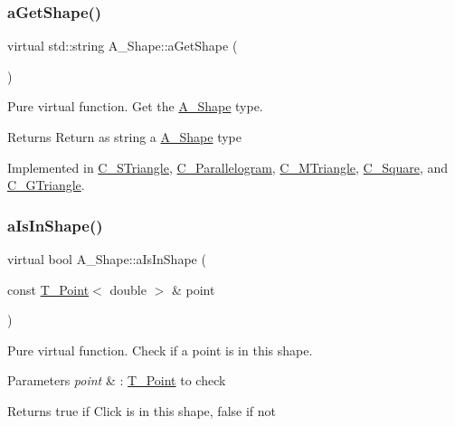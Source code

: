 \subsubsection{\texorpdfstring{a\+Get\+Shape()}{aGetShape()}}
{\footnotesize\ttfamily virtual std\+::string A\+\_\+\+Shape\+::a\+Get\+Shape (\begin{DoxyParamCaption}{ }\end{DoxyParamCaption})\hspace{0.3cm}{\ttfamily [pure virtual]}}



Pure virtual function. Get the \hyperlink{classA__Shape}{A\+\_\+\+Shape} type. 

\begin{DoxyReturn}{Returns}
Return as string a \hyperlink{classA__Shape}{A\+\_\+\+Shape} type 
\end{DoxyReturn}


Implemented in \hyperlink{classC__STriangle_a40c1434870b99112c4457819c9295483}{C\+\_\+\+S\+Triangle}, \hyperlink{classC__Parallelogram_a373fdd3ebdfeffcaa0a72ff7001af8ec}{C\+\_\+\+Parallelogram}, \hyperlink{classC__MTriangle_aca7e38c6bf9695aacf54aa03ecfba978}{C\+\_\+\+M\+Triangle}, \hyperlink{classC__Square_a4919017d3750c1b8deb5f07d22069636}{C\+\_\+\+Square}, and \hyperlink{classC__GTriangle_a039e79bb17dae01997b11243de457d98}{C\+\_\+\+G\+Triangle}.

\mbox{\label{classA__Shape_a63f825cbc9780208d9a137f5c14917d0}} 
\subsubsection{\texorpdfstring{a\+Is\+In\+Shape()}{aIsInShape()}}
{\footnotesize\ttfamily virtual bool A\+\_\+\+Shape\+::a\+Is\+In\+Shape (\begin{DoxyParamCaption}\item[{const \hyperlink{classT__Point}{T\+\_\+\+Point}$<$ double $>$ \&}]{point }\end{DoxyParamCaption})\hspace{0.3cm}{\ttfamily [pure virtual]}}



Pure virtual function. Check if a point is in this shape. 


\begin{DoxyParams}{Parameters}
{\em point} & \+: \hyperlink{classT__Point}{T\+\_\+\+Point} to check \\
\hline
\end{DoxyParams}
\begin{DoxyReturn}{Returns}
true if Click is in this shape, false if not 
\end{DoxyReturn}


